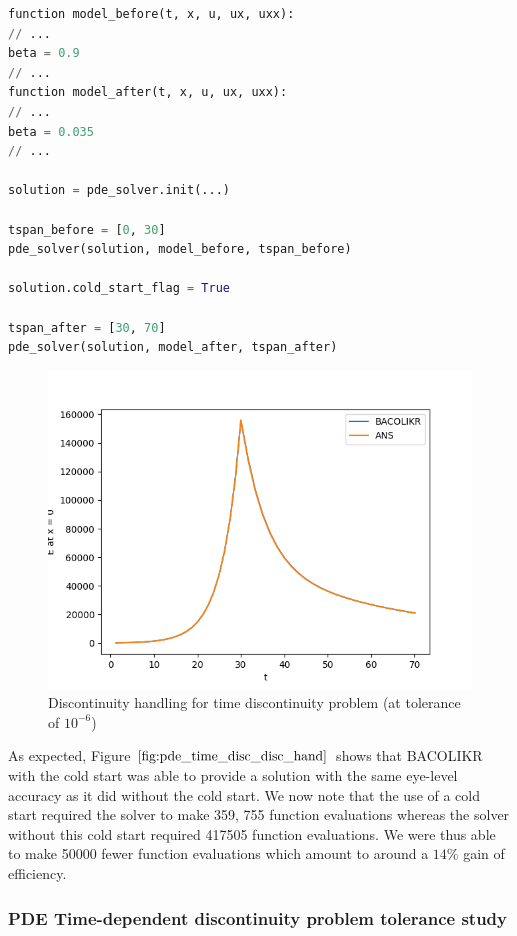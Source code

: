 \documentclass{article}
\begin{document}
\begin{minipage}{\linewidth}
\begin{lstlisting}[language=Python]
function model_before(t, x, u, ux, uxx):
// ...
beta = 0.9
// ...
function model_after(t, x, u, ux, uxx):
// ...
beta = 0.035
// ...

solution = pde_solver.init(...)

tspan_before = [0, 30]
pde_solver(solution, model_before, tspan_before)

solution.cold_start_flag = True

tspan_after = [30, 70]
pde_solver(solution, model_after, tspan_after)

\end{lstlisting}
\end{minipage}

\begin{figure}[H]
\centering
\includegraphics[width=0.7\linewidth]{./figures/pde_time_disc_disc_hand}
\caption{Discontinuity handling for time discontinuity problem (at tolerance of $10^{-6}$)}
\label{fig:pde_time_disc_disc_hand}
\end{figure}

As expected, Figure $\ref{fig:pde_time_disc_disc_hand}$ shows that BACOLIKR with the cold start was able to provide a solution with the same eye-level accuracy as it did without the cold start.
We now note that the use of a cold start required the solver to make 359, 755 function evaluations whereas the solver without this cold start required 417505 function evaluations. We were thus able to make 50000 fewer function evaluations which amount to around a $14\%$ gain of efficiency.

\subsubsection{PDE Time-dependent discontinuity problem tolerance study}
\label{subsubsection:pde_time_tol}
\end{document}
